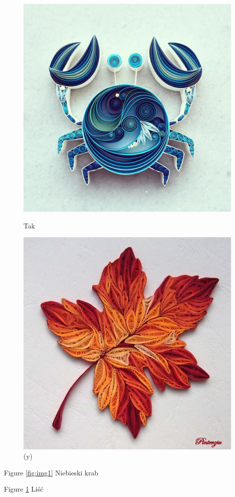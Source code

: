 \documentclass[11pt]{article}
\begin{document}
\begin{center}
\begin{figure}[!tbp]
  \centering
  \begin{minipage}[b]{0.4\textwidth}
    \includegraphics[width=\textwidth]{img1}
    \caption{Tak}
    \label{fig:img1}
  \end{minipage}
  \hfill
  \begin{minipage}[b]{0.4\textwidth}
    \includegraphics[width=\textwidth]{img2}
    \caption{(y)}
    \label{fig:img2}
  \end{minipage}
\end{figure}
Figure \ref{fig:img1} Niebieski krab

Figure \ref{fig:img2} Liść
\end{center}
\end{document}
